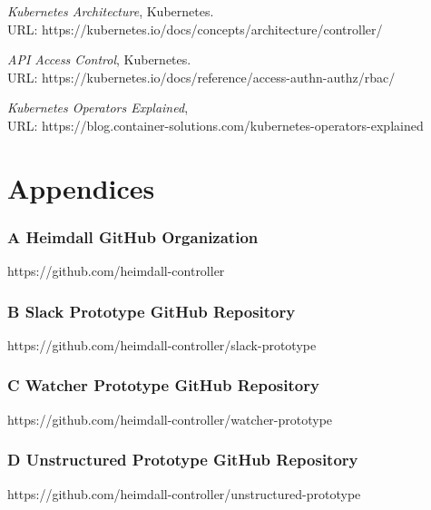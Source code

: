 \documentclass{article}
\begin{document}
\begin{thebibliography}{9}
\emph{Kubernetes Architecture}, Kubernetes. \\URL: https://kubernetes.io/docs/concepts/architecture/controller/ 
  
\emph{API Access Control}, Kubernetes. \\ URL: https://kubernetes.io/docs/reference/access-authn-authz/rbac/  

\emph{Kubernetes Operators Explained}, \\URL: https://blog.container-solutions.com/kubernetes-operators-explained
  


\end{thebibliography}

\clearpage
\section*{Appendices}
\subsubsection*{A Heimdall GitHub Organization} 
\hypertarget{appendix-a}{https://github.com/heimdall-controller}

\subsubsection*{B Slack Prototype GitHub Repository} 
\hypertarget{appendix-b}{https://github.com/heimdall-controller/slack-prototype}

\subsubsection*{C Watcher Prototype GitHub Repository} 
\hypertarget{appendix-c}{https://github.com/heimdall-controller/watcher-prototype}

\subsubsection*{D Unstructured Prototype GitHub Repository} 
\hypertarget{appendix-d}{https://github.com/heimdall-controller/unstructured-prototype}
\end{document}

